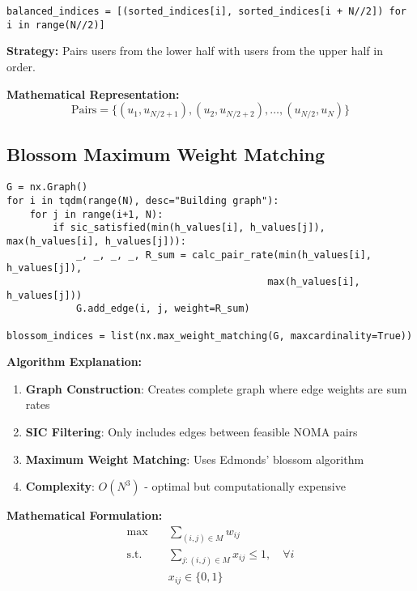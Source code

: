 \documentclass[11pt,a4paper]{article}
\begin{document}
\begin{lstlisting}[caption={Balanced Clustering Implementation}]
balanced_indices = [(sorted_indices[i], sorted_indices[i + N//2]) for i in range(N//2)]
\end{lstlisting}

\textbf{Strategy:} Pairs users from the lower half with users from the upper half in order.

\textbf{Mathematical Representation:}
\begin{equation}
\text{Pairs} = \{(u_1, u_{N/2+1}), (u_2, u_{N/2+2}), \ldots, (u_{N/2}, u_N)\}
\end{equation}

\subsection{Blossom Maximum Weight Matching}

\begin{lstlisting}[caption={Blossom Algorithm Implementation}]
G = nx.Graph()
for i in tqdm(range(N), desc="Building graph"):
    for j in range(i+1, N):
        if sic_satisfied(min(h_values[i], h_values[j]), max(h_values[i], h_values[j])):
            _, _, _, _, R_sum = calc_pair_rate(min(h_values[i], h_values[j]), 
                                             max(h_values[i], h_values[j]))
            G.add_edge(i, j, weight=R_sum)

blossom_indices = list(nx.max_weight_matching(G, maxcardinality=True))
\end{lstlisting}

\textbf{Algorithm Explanation:}

\begin{enumerate}
    \item \textbf{Graph Construction}: Creates complete graph where edge weights are sum rates
    \item \textbf{SIC Filtering}: Only includes edges between feasible NOMA pairs
    \item \textbf{Maximum Weight Matching}: Uses Edmonds' blossom algorithm
    \item \textbf{Complexity}: $O(N^3)$ - optimal but computationally expensive
\end{enumerate}

\textbf{Mathematical Formulation:}
\begin{align}
\max \quad &\sum_{(i,j) \in M} w_{ij} \\
\text{s.t.} \quad &\sum_{j:(i,j) \in M} x_{ij} \leq 1, \quad \forall i \\
&x_{ij} \in \{0,1\}
\end{align}
\end{document}
